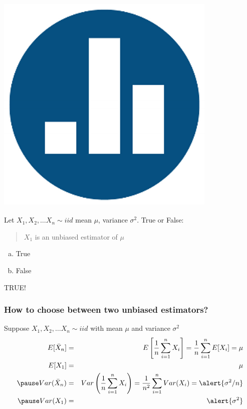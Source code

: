 \documentclass[handout]{beamer}
\begin{document}
\begin{frame}
\frametitle{\includegraphics[scale = 0.05]{./images/clicker}}
Let $X_1, X_2, \hdots X_n \sim iid$ mean $\mu$, variance $\sigma^2$. True or False:

\vspace{1em}
\begin{quotation}
$X_1$ is an unbiased estimator of $\mu$
\end{quotation}

\begin{enumerate}[(a)]
\item True
\item False
\end{enumerate}

\pause \alert{TRUE!}
\end{frame}
\begin{frame}
\frametitle{How to choose between two unbiased estimators?}

Suppose $X_1, X_2, \hdots X_n \sim iid$ with mean $\mu$ and variance $\sigma^2$
\begin{eqnarray*}
E[\bar{X}_n] &=& E\left[\frac{1}{n}\sum_{i=1}^n X_i\right] = \frac{1}{n}\sum_{i=1}^n E[X_i] = \mu\\
E[X_1] &=& \mu\\
\pause
Var(\bar{X}_n) &=& Var\left(\frac{1}{n}\sum_{i=1}^n X_i\right) = \frac{1}{n^2} \sum_{i=1}^n Var(X_i) = \alert{\sigma^2/n}\\
\pause
Var(X_1) &=& \alert{\sigma^2}
\end{eqnarray*}
\end{frame}
\end{document}
